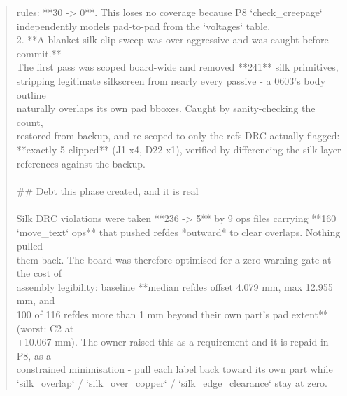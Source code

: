 \documentclass[11pt,a4paper]{article}
\begin{document}
\begin{quote}
   rules: {*}{*}30 -\textgreater{} 0{*}{*}. This loses no coverage because P8 `check\_creepage`\\
   independently models pad-to-pad from the `voltages` table.\\
2. {*}{*}A blanket silk-clip sweep was over-aggressive and was caught before commit.{*}{*}\\
   The first pass was scoped board-wide and removed {*}{*}241{*}{*} silk primitives,\\
   stripping legitimate silkscreen from nearly every passive - a 0603's body outline\\
   naturally overlaps its own pad bboxes. Caught by sanity-checking the count,\\
   restored from backup, and re-scoped to only the refs DRC actually flagged:\\
   {*}{*}exactly 5 clipped{*}{*} (J1 x4, D22 x1), verified by differencing the silk-layer\\
   references against the backup.\\
~\\
\#\# Debt this phase created, and it is real\\
~\\
Silk DRC violations were taken {*}{*}236 -\textgreater{} 5{*}{*} by 9 ops files carrying {*}{*}160\\
`move\_text` ops{*}{*} that pushed refdes {*}outward{*} to clear overlaps. Nothing pulled\\
them back. The board was therefore optimised for a zero-warning gate at the cost of\\
assembly legibility: baseline {*}{*}median refdes offset 4.079 mm, max 12.955 mm, and\\
100 of 116 refdes more than 1 mm beyond their own part's pad extent{*}{*} (worst: C2 at\\
+10.067 mm). The owner raised this as a requirement and it is repaid in P8, as a\\
constrained minimisation - pull each label back toward its own part while\\
`silk\_overlap` / `silk\_over\_copper` / `silk\_edge\_clearance` stay at zero.
\end{quote}
\end{document}
